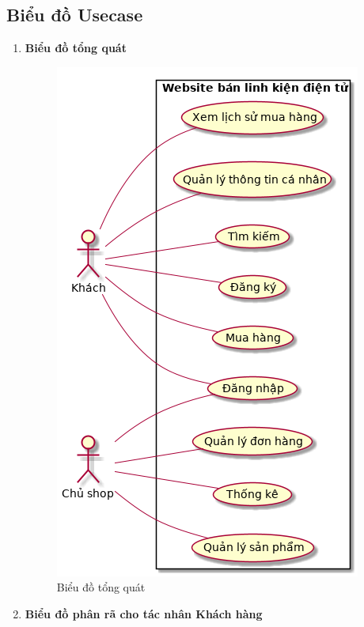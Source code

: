 \subsection{Biểu đồ Usecase}
\begin{enumerate}[label=\textbf{\alph*)}]
	\item \textbf{Biểu đồ tổng quát}
	      \begin{figure}[h!]
		      \centering
		      \includegraphics[scale=0.7]{fig/uc_all.png}
		      \caption{Biểu đồ tổng quát}
	      \end{figure}
	      \newpage
	\item \textbf{Biểu đồ phân rã cho tác nhân Khách hàng}
	      \begin{figure}[h!]
		      \centering

\end{figure}
\end{enumerate}
